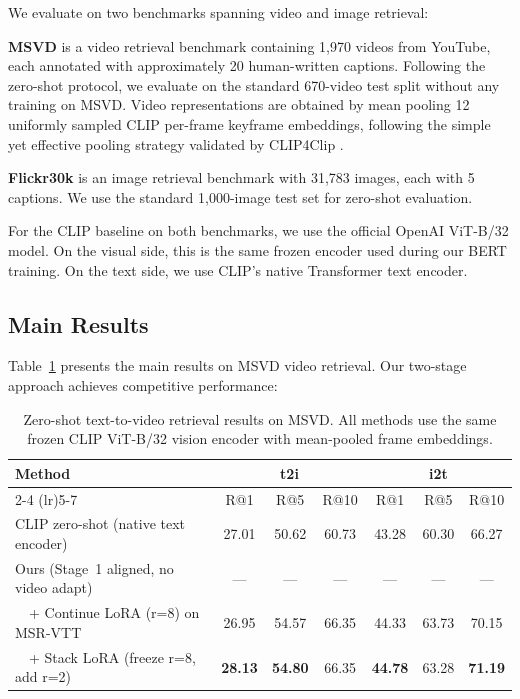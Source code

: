 \documentclass[10pt,leqno]{amsart}
\begin{document}
We evaluate on two benchmarks spanning video and image retrieval:

\textbf{MSVD} \citep{chen2011collecting} is a video retrieval benchmark containing 1,970 videos from YouTube, each annotated with approximately 20 human-written captions. Following the zero-shot protocol, we evaluate on the standard 670-video test split without any training on MSVD. Video representations are obtained by mean pooling 12 uniformly sampled CLIP per-frame keyframe embeddings, following the simple yet effective pooling strategy validated by CLIP4Clip \citep{luo2022clip4clip}.

\textbf{Flickr30k} \citep{plummer2015flickr30k} is an image retrieval benchmark with 31,783 images, each with 5 captions. We use the standard 1,000-image test set for zero-shot evaluation.

For the CLIP baseline on both benchmarks, we use the official OpenAI ViT-B/32 model. On the visual side, this is the same frozen encoder used during our BERT training. On the text side, we use CLIP's native Transformer text encoder.

\subsection{Main Results}

Table~\ref{tab:video_results} presents the main results on MSVD video retrieval. Our two-stage approach achieves competitive performance:

\begin{table}[h]
\centering
\caption{Zero-shot text-to-video retrieval results on MSVD. All methods use the same frozen CLIP ViT-B/32 vision encoder with mean-pooled frame embeddings.}
\label{tab:video_results}
\begin{tabular}{lcccccc}
\toprule
Method & \multicolumn{3}{c}{t2i} & \multicolumn{3}{c}{i2t} \\
\cmidrule(lr){2-4} \cmidrule(lr){5-7}
 & R@1 & R@5 & R@10 & R@1 & R@5 & R@10 \\
\midrule
CLIP zero-shot (native text encoder) & 27.01 & 50.62 & 60.73 & 43.28 & 60.30 & 66.27 \\
Ours (Stage~1 aligned, no video adapt) & --- & --- & --- & --- & --- & --- \\
~~+ Continue LoRA (r=8) on MSR-VTT & 26.95 & 54.57 & 66.35 & 44.33 & 63.73 & 70.15 \\
~~+ Stack LoRA (freeze r=8, add r=2) & \textbf{28.13} & \textbf{54.80} & 66.35 & \textbf{44.78} & 63.28 & \textbf{71.19} \\
\bottomrule
\end{tabular}
\end{table}
\end{document}
